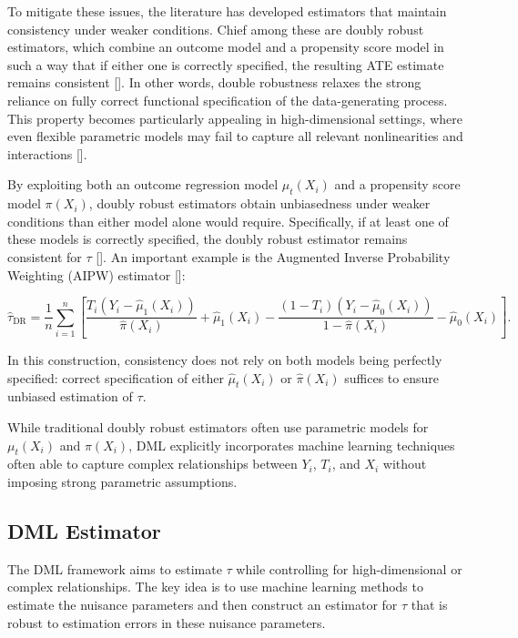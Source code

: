 \documentclass{article}
\numberwithin{equation}{section}
\begin{document}
To mitigate these issues, the literature has developed estimators that maintain consistency under weaker conditions. Chief among these are doubly robust estimators, which combine an outcome model and a propensity score model in such a way that if either one is correctly specified, the resulting ATE estimate remains consistent [\cite{RobinsRotnitzkyZhao1994, BangRobins2005}]. In other words, double robustness relaxes the strong reliance on fully correct functional specification of the data-generating process. This property becomes particularly appealing in high-dimensional settings, where even flexible parametric models may fail to capture all relevant nonlinearities and interactions [\cite{Chernozhukov2018}].

By exploiting both an outcome regression model \(\mu_t(X_i)\) and a propensity score model \(\pi(X_i)\), doubly robust estimators obtain unbiasedness under weaker conditions than either model alone would require. Specifically, if at least one of these models is correctly specified, the doubly robust estimator remains consistent for \(\tau\) [\cite{RobinsRotnitzkyZhao1994, BangRobins2005}]. An important example is the Augmented Inverse Probability Weighting (AIPW) estimator [\cite{GlynnQuinn2010}]:

\begin{equation}
    \hat{\tau}_{\text{DR}} = \frac{1}{n}\sum_{i=1}^n \left[
    \frac{T_i(Y_i - \hat{\mu}_1(X_i))}{\hat{\pi}(X_i)} + \hat{\mu}_1(X_i)
    - \frac{(1 - T_i)(Y_i - \hat{\mu}_0(X_i))}{1 - \hat{\pi}(X_i)} - \hat{\mu}_0(X_i)
    \right].
\label{eq:dr_estimator}
\end{equation}

In this construction, consistency does not rely on both models being perfectly specified: correct specification of either \(\hat{\mu}_t(X_i)\) or \(\hat{\pi}(X_i)\) suffices to ensure unbiased estimation of \(\tau\).

While traditional doubly robust estimators often use parametric models for $\mu_t(X_i)$ and $\pi(X_i)$, DML explicitly incorporates machine learning techniques often able to capture complex relationships between $Y_i$, $T_i$, and $X_i$ without imposing strong parametric assumptions.

\subsection{DML Estimator}

The DML framework aims to estimate $\tau$ while controlling for high-dimensional or complex relationships. The key idea is to use machine learning methods to estimate the nuisance parameters and then construct an estimator for $\tau$ that is robust to estimation errors in these nuisance parameters.
\end{document}
